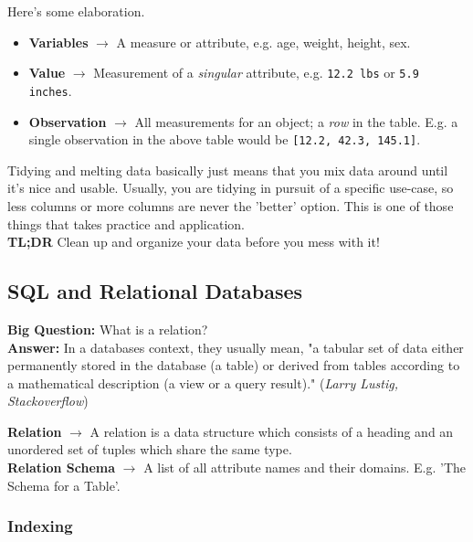 \documentclass[english, 10pt]{article}
\begin{document}
\hfill \break Here's some elaboration.

\begin{itemize}
	\item \textbf{Variables} $\rightarrow$ A measure or attribute, e.g. age, weight, height, sex.
	\item \textbf{Value} $\rightarrow$ Measurement of a \textit{singular} attribute, e.g. \texttt{12.2 lbs} or \texttt{5.9 inches}.
	\item \textbf{Observation} $\rightarrow$ All measurements for an object; a \textit{row} in the table. E.g. a single observation in the above table would be \texttt{[12.2, 42.3, 145.1]}.
\end{itemize}

Tidying and melting data basically just means that you mix data around until it's nice and usable. Usually, you are tidying in pursuit of a specific use-case, so less columns or more columns are never the 'better' option. This is one of those things that takes practice and application.\\

\textbf{TL;DR} Clean up and organize your data before you mess with it!

\subsection{SQL and Relational Databases}

\textbf{Big Question:} What is a relation?\\
\textbf{Answer:} In a databases context, they usually mean, "a tabular set of data either permanently stored in the database (a table) or derived from tables according to a mathematical description (a view or a query result)." (\textit{Larry Lustig, Stackoverflow})\\

\begin{tcolorbox}[title=Definition:,colframe=red!75!black,colback=red!5!white,arc=0pt,fonttitle=\bfseries]
\textbf{Relation} $\rightarrow$ A relation is a data structure which consists of a heading and an unordered set of tuples which share the same type.\\
\textbf{Relation Schema} $\rightarrow$ A list of all attribute names and their domains. E.g. 'The Schema for a Table'.
\end{tcolorbox}

\subsubsection{Indexing}
\end{document}
